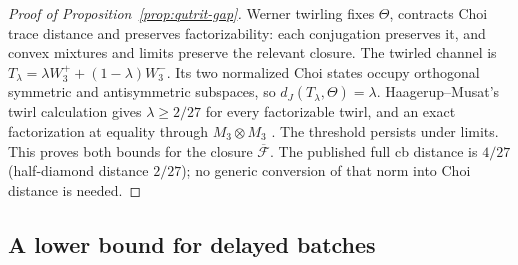 \begin{proof}[Proof of Proposition~\ref{prop:qutrit-gap}]
Werner twirling fixes $\Theta$, contracts Choi trace distance and
preserves factorizability: each conjugation preserves it, and convex
mixtures and limits preserve the relevant closure. The twirled channel
is $T_\lambda=\lambda W_3^++(1-\lambda)W_3^-$. Its two normalized
Choi states occupy orthogonal symmetric and antisymmetric subspaces,
so $d_J(T_\lambda,\Theta)=\lambda$.
Haagerup--Musat's twirl calculation gives
$\lambda\geq2/27$ for every factorizable twirl, and an exact
factorization at equality through $M_3\otimes M_3$
\cite[Lemmas~5.4 and~5.5, Theorem~5.6 and Corollary~5.7]{HaagerupMusat2015}. The threshold persists under limits.
This proves both bounds for the closure $\overline{\mathcal F}$. The published
full cb distance is $4/27$ (half-diamond distance $2/27$); no generic conversion of that norm into
Choi distance is needed.
\end{proof}

\subsection{A lower bound for delayed batches}

